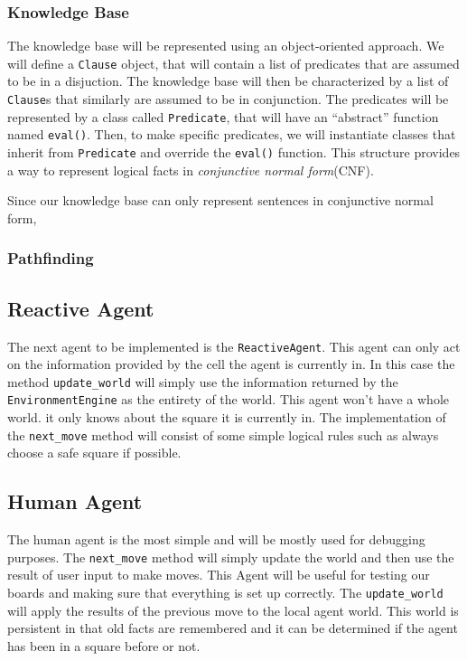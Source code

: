 \documentclass{article}
\begin{document}
			\subsubsection{Knowledge Base}
			
				The knowledge base will be represented using an object-oriented approach.
				We will define a \texttt{Clause} object, that will contain a list of predicates that are assumed to be in a disjuction. The knowledge base will then be characterized by a list of \texttt{Clause}s that similarly are assumed to be in conjunction. 
				The predicates will be represented by a class called \texttt{Predicate}, that will have an ``abstract'' function named \texttt{eval()}. Then, to make specific predicates, we will instantiate classes that inherit from \texttt{Predicate} and override the \texttt{eval()} function. This structure provides a way to represent logical facts in \textit{conjunctive normal form}(CNF).
				
				Since our knowledge base can only represent sentences in conjunctive normal form, 
			
			
			\subsubsection{Pathfinding}
			
		\subsection{Reactive Agent}
			The next agent to be implemented is the \texttt{ReactiveAgent}. This agent can only act on the information provided by the cell the agent is currently in. In this case the method \texttt{update\_world} will simply use  the information returned by the \texttt{EnvironmentEngine} as the entirety of the world. This agent won't have a whole world. it only knows about the square it is currently in. The implementation of the \texttt{next\_move} method will consist of some simple logical rules such as always choose a safe square if possible.
		
		\subsection{Human Agent}
		 The human agent is the most simple and will be mostly used for debugging purposes. The \texttt{next\_move} method will simply update the world and then use the result of user input to make moves. This Agent will be useful for testing our boards and making sure that everything is set up correctly. The \texttt{update\_world} will apply the results of the previous move to the local agent world. This world is persistent in that old facts are remembered and it can be determined if the agent has been in a square before or not. 
\end{document}
